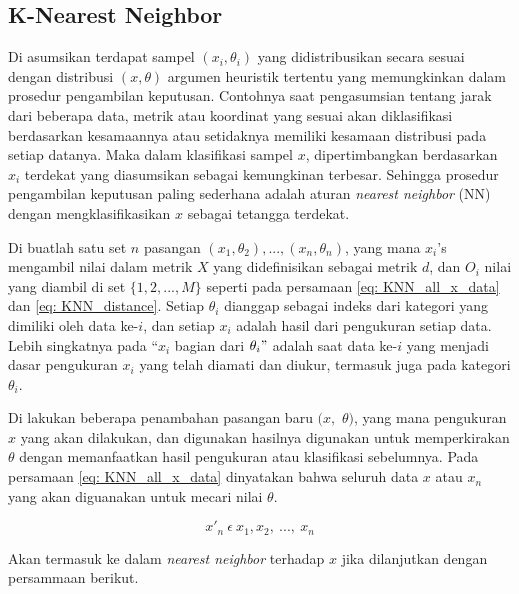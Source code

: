 \begin{subs}
	\subsection{K-Nearest Neighbor}
	\label{sec:sub_sec2_knn}
	\vspace{1ex}
	
	Di asumsikan terdapat sampel $(x_{i}, \theta_{i})$ yang didistribusikan secara sesuai dengan distribusi $(x, \theta)$ argumen heuristik tertentu yang memungkinkan dalam prosedur pengambilan keputusan. Contohnya saat pengasumsian tentang jarak dari beberapa data, metrik atau koordinat yang sesuai akan diklasifikasi berdasarkan kesamaannya atau setidaknya memiliki kesamaan distribusi pada setiap datanya. Maka dalam klasifikasi sampel $x$, dipertimbangkan berdasarkan $x_{i}$ terdekat yang diasumsikan sebagai kemungkinan terbesar. Sehingga prosedur pengambilan keputusan paling sederhana adalah aturan \textit{nearest neighbor} (NN) dengan mengklasifikasikan $x$ sebagai tetangga terdekat.
	\vspace{1ex}
	
	Di buatlah satu set $n$ pasangan $(x_{1}, \theta_{2}), ..., (x_{n}, \theta_{n})$, yang mana $x_{i}$'s mengambil nilai dalam metrik $X$ yang didefinisikan sebagai metrik $d$, dan $O_{i}$ nilai yang diambil di set $\{1, 2, ..., M\}$ seperti pada persamaan \ref{eq: KNN_all_x_data} dan \ref{eq: KNN_distance}. Setiap $\theta_{i}$ dianggap sebagai indeks dari kategori yang dimiliki oleh data ke-$i$, dan setiap $x_{i}$ adalah hasil dari pengukuran setiap data. Lebih singkatnya pada ``$x_{i}$ bagian dari $\theta_{i}"$ adalah saat data ke-$i$ yang menjadi dasar pengukuran $x_{i}$ yang telah diamati dan diukur, termasuk juga pada kategori $\theta_{i}$.
	\vspace{1ex}
	
	Di lakukan beberapa penambahan pasangan baru $(x,$ $\theta)$, yang mana pengukuran $x$ yang akan dilakukan, dan digunakan hasilnya digunakan untuk memperkirakan $\theta$ dengan memanfaatkan hasil pengukuran atau klasifikasi sebelumnya. Pada persamaan \ref{eq: KNN_all_x_data} dinyatakan bahwa seluruh data $x$ atau $x_{n}$ yang akan diguanakan untuk mecari nilai $\theta$.
	
	\begin{equation}\label{eq: KNN_all_x_data}
	x'_{n}\ \epsilon\ x_{1}, x_{2},\ ...,\ x_{n}
	\end{equation}
	
	\noindent Akan termasuk ke dalam \textit{nearest neighbor} terhadap $x$ jika dilanjutkan dengan persammaan berikut.
	

\end{subs}
